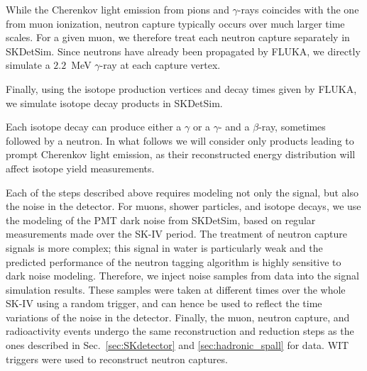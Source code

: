 While the Cherenkov light emission from pions and $\gamma$-rays coincides with the one from muon ionization, neutron capture typically occurs over much larger time scales. For a given muon, we therefore treat each neutron capture separately in SKDetSim. Since neutrons have already been propagated by FLUKA, we directly simulate a $2.2$~MeV $\gamma$-ray at each capture vertex. 


Finally, using the isotope production vertices and decay times given by FLUKA, we simulate isotope decay products in SKDetSim.

Each isotope decay can produce either a $\gamma$ or a $\gamma$- and a $\beta$-ray, sometimes followed by a neutron. In what follows we will consider only products leading to prompt Cherenkov light emission, as their reconstructed energy distribution will affect isotope yield measurements.


Each of the steps described above requires modeling not only the signal, but also the noise in the detector. For muons, shower particles, and isotope decays, we use the modeling of the PMT dark noise from SKDetSim, based on regular measurements made over the SK-IV period. The treatment of neutron capture signals is more complex; this signal in water is particularly weak and the predicted performance of the neutron tagging algorithm is highly sensitive to dark noise modeling. Therefore, we inject noise samples from data into the signal simulation results. These samples were taken at different times over the whole SK-IV using a random trigger, and can hence be used to reflect the time variations of the noise in the detector. Finally, the muon, neutron capture, and radioactivity events undergo the same reconstruction and reduction steps as the ones described in Sec.~\ref{sec:SKdetector} and \ref{sec:hadronic_spall} for data. WIT triggers were used to reconstruct neutron captures.



